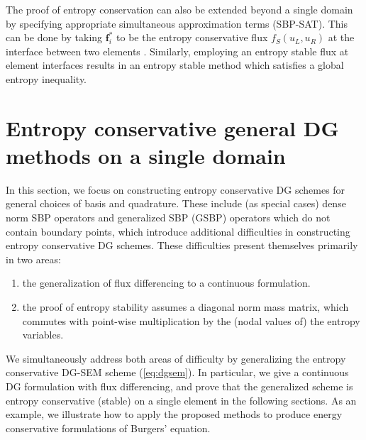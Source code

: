 \documentclass[preprint,10pt]{article}
\theoremstyle{definition}
\theoremstyle{lemma}
\theoremstyle{theorem}
\theoremstyle{assumption}
\begin{document}
The proof of entropy conservation can also be extended beyond a single domain by specifying appropriate simultaneous approximation terms (SBP-SAT).  This can be done by taking $\bm{f}_i^*$ to be the entropy conservative flux $f_S(u_L,u_R)$ at the interface between two elements \cite{carpenter2014entropy, gassner2017br1, chen2017entropy}.  Similarly, employing an entropy stable flux at element interfaces results in an entropy stable method which satisfies a global entropy inequality.  


\section{Entropy conservative general DG methods on a single domain}
\label{sec:ecdg}

In this section, we focus on constructing entropy conservative DG schemes for general choices of basis and quadrature.  These include (as special cases) dense norm SBP operators and generalized SBP (GSBP) operators which do not contain boundary points, which introduce additional difficulties in constructing entropy conservative DG schemes.  These difficulties present themselves primarily in two areas: 
\begin{enumerate}
\item the generalization of flux differencing to a continuous formulation.  
\item the proof of entropy stability assumes a diagonal norm mass matrix, which commutes with point-wise multiplication by the (nodal values of) the entropy variables.  
\end{enumerate}

We simultaneously address both areas of difficulty by generalizing the entropy conservative DG-SEM scheme (\ref{eq:dgsem}).  In particular, we give a continuous DG formulation with flux differencing, and prove that the generalized scheme is entropy conservative (stable) on a single element in the following sections.  As an example, we illustrate how to apply the proposed methods to produce energy conservative formulations of Burgers' equation.  


\end{document}
